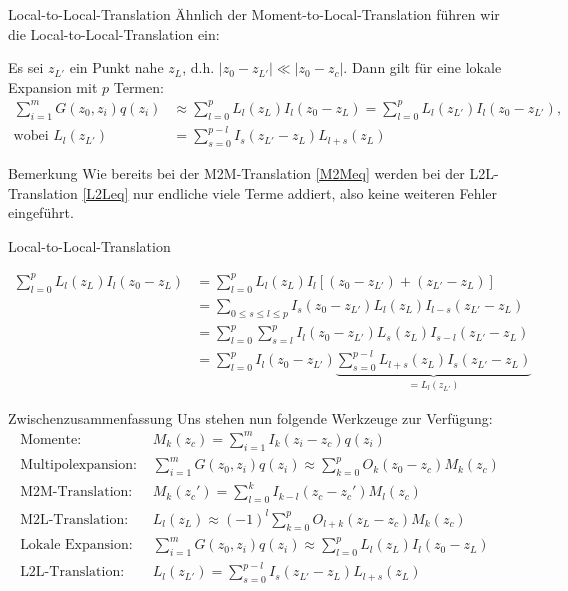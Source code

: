 \documentclass[ngerman]{beamer}
\begin{document}
\begin{frame}{Local-to-Local-Translation}
\normalsize
Ähnlich der Moment-to-Local-Translation führen wir die Local-to-Local-Translation ein:
\begin{Satz}
Es sei $z_{L'}$ ein Punkt nahe $z_L$, d.h. $|z_0-z_{L'}|\ll |z_0-z_c|$. Dann gilt für eine lokale Expansion mit $p$ Termen:
\begin{align}
\sum_{i=1}^m {G(z_0,z_i)q(z_i)} &\approx \sum_{l=0}^p L_l(z_L)I_l(z_0-z_L) = \sum_{l=0}^p L_l(z_{L'})I_l(z_0-z_{L'}),\nonumber\\
\text{wobei } L_l(z_{L'})&=\sum_{s=0}^{p-l} I_s(z_{L'}-z_L)L_{l+s}(z_L)\label{L2Leq}
\end{align}
\end{Satz}
\begin{block}{Bemerkung}
Wie bereits bei der M2M-Translation \eqref{M2Meq} werden bei der L2L-Translation \eqref{L2Leq} nur endliche viele Terme addiert, also keine weiteren Fehler eingeführt.
\end{block}
\end{frame}

\begin{frame}{Local-to-Local-Translation}
\begin{Beweis}
\begin{align*}
\sum_{l=0}^p L_l(z_L)I_l(z_0-z_L) &= \sum_{l=0}^p L_l(z_L)I_l\left[(z_0-z_{L'}) + (z_{L'}-z_L)\right]\\
&=\sum_{0\leq s\leq l \leq p} I_s(z_0-z_{L'}) L_l(z_L)I_{l-s}(z_{L'}-z_L)\\
&=\sum_{l=0}^p \sum_{s=l}^p I_l(z_0-z_{L'}) L_s(z_L)I_{s-l}(z_{L'}-z_L) \\
&=\sum_{l=0}^p I_l(z_0-z_{L'}) \underbrace{\sum_{s=0}^{p-l}  L_{l+s}(z_L)I_{s}(z_{L'}-z_L)}_{=L_l(z_{L'})}
\end{align*}
\end{Beweis}
\end{frame}

\begin{frame}{Zwischenzusammenfassung}
Uns stehen nun folgende Werkzeuge zur Verfügung:
\small
\begin{align*}
\text{Momente: }& M_k(z_c) =  \sum_{i=1}^m I_k(z_i-z_c) q(z_i)\\
\text{Multipolexpansion: }&\sum_{i=1}^m {G(z_0,z_i)q(z_i)} \approx \sum_{k=0}^p O_k(z_0-z_c)M_k(z_c)\\
\text{M2M-Translation: }& M_k(z_c') = \sum_{l=0}^k I_{k-l}(z_c-z_c')M_l(z_c)\\
\text{M2L-Translation: }&L_l(z_L)\approx(-1)^l\sum_{k=0}^p O_{l+k}(z_L-z_c)M_k(z_c) \\
\text{Lokale Expansion: }&\sum_{i=1}^m {G(z_0,z_i)q(z_i)} \approx \sum_{l=0}^p L_l(z_L)I_l(z_0-z_L)\\
\text{L2L-Translation: }&L_l(z_{L'})=\sum_{s=0}^{p-l} I_s(z_{L'}-z_L)L_{l+s}(z_L)
\end{align*}
\end{frame}
\end{document}
